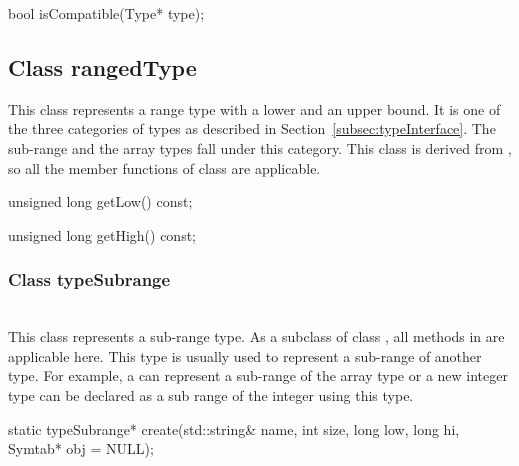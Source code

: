 \begin{apient}
bool isCompatible(Type* type);
\end{apient}

\subsection{Class rangedType}


This class represents a range type with a lower and an upper bound. It is one of the three categories of types as described in Section~\ref{subsec:typeInterface}. The sub-range and the array types fall under this category. This class is derived from , so all the member functions of class  are applicable.


\begin{apient}
unsigned long getLow() const;
\end{apient}

\begin{apient}
unsigned long getHigh() const;
\end{apient}

\subsubsection{Class typeSubrange}


\mbox{ }\\

This class represents a sub-range type. As a subclass of class , all methods in  are applicable here. This type is usually used to represent a sub-range of another type. For example, a  can represent a sub-range of the array type or a new integer type can be declared as a sub range of the integer using this type.


\begin{apient}
static typeSubrange* create(std::string& name,
                            int size,
                            long low,
                            long hi,
                            Symtab* obj = NULL);
\end{apient}

